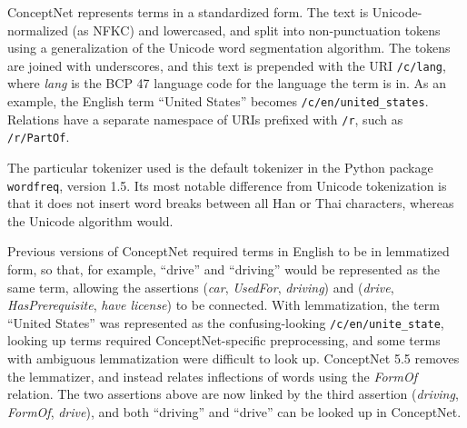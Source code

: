 \documentclass[letterpaper]{article}
\begin{document}
ConceptNet represents terms in a standardized form. The text is
Unicode-normalized (as NFKC) and lowercased, and split into
non-punctuation tokens using a generalization of the Unicode word
segmentation algorithm. The tokens are joined with underscores, and this
text is prepended with the URI \texttt{/c/lang}, where \emph{lang} is
the BCP 47 language code for the language the term is in. As an example,
the English term ``United States'' becomes
\texttt{/c/en/united\_states}. Relations have a separate namespace of
URIs prefixed with \texttt{/r}, such as \texttt{/r/PartOf}.

The particular tokenizer used is the default tokenizer in the Python
package \texttt{wordfreq}, version 1.5. Its most notable difference from
Unicode tokenization is that it does not insert word breaks between all
Han or Thai characters, whereas the Unicode algorithm would.


Previous versions of ConceptNet required terms in English to be in lemmatized
form, so that, for example, ``drive'' and ``driving'' would be represented as
the same term, allowing the assertions (\emph{car}, \emph{UsedFor},
\emph{driving}) and (\emph{drive}, \emph{HasPrerequisite}, \emph{have license})
to be connected. With lemmatization, the term ``United States'' was represented
as the confusing-looking \texttt{/c/en/unite\_state}, looking up terms required
ConceptNet-specific preprocessing, and some terms with ambiguous lemmatization
were difficult to look up. ConceptNet 5.5 removes the lemmatizer, and instead
relates inflections of words using the \emph{FormOf} relation. The two
assertions above are now linked by the third assertion (\emph{driving},
\emph{FormOf}, \emph{drive}), and both ``driving'' and ``drive'' can be looked
up in ConceptNet.
\end{document}
